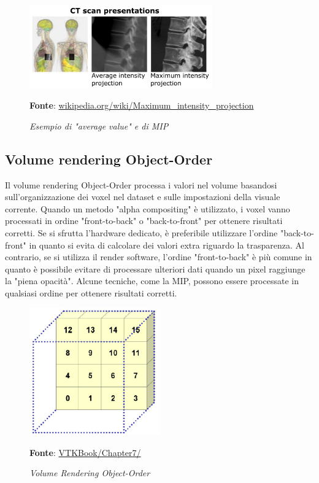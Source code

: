 \begin{figure}[h]
    \centering
    \includegraphics[width=0.7\textwidth]{immagini/volumerendering/mip.jpg}
    \caption{\textit{Esempio di "average value" e di MIP}}
    \textbf{Fonte}: \href{https://en.wikipedia.org/wiki/Maximum_intensity_projection}{wikipedia.org/wiki/Maximum\_intensity\_projection}
    \label{fig: Volume Rendering Example}
\end{figure}

\subsection{Volume rendering Object-Order}\label{sec:volume-object-order}
Il volume rendering Object-Order processa i valori nel volume basandosi sull'organizzazione dei voxel nel dataset e sulle impostazioni della visuale corrente. Quando un metodo "alpha compositing" è utilizzato, i voxel vanno processati in ordine "front-to-back" o "back-to-front" per ottenere risultati corretti. Se si sfrutta l'hardware dedicato, è preferibile utilizzare l'ordine "back-to-front" in quanto si evita di calcolare dei valori extra riguardo la trasparenza. Al contrario, se si utilizza il render software, l'ordine "front-to-back" è più comune in quanto è possibile evitare di processare ulteriori dati quando un pixel raggiunge la "piena opacità". Alcune tecniche, come la MIP, possono essere processate in qualsiasi ordine per ottenere risultati corretti.

\begin{figure}[h]
    \centering
    \includegraphics[width=0.5\textwidth]{immagini/volumerendering/objectorder.png}
    \caption{\textit{Volume Rendering Object-Order}}
    \textbf{Fonte}: \href{https://lorensen.github.io/VTKExamples/site/VTKBook/07Chapter7/}{VTKBook/Chapter7/}
    \label{fig: Volume Rendering Object-Order}
\end{figure}

